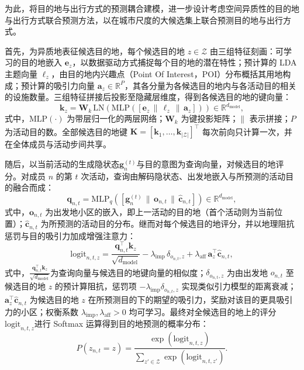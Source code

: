 为此，将目的地与出行方式的预测耦合建模，进一步设计考虑空间异质性的目的地与出行方式联合预测方法，以在城市尺度的大候选集上联合预测目的地与出行方式。

首先，为异质地表征候选目的地，每个候选目的地 $z\in\mathcal{Z}$ 由三组特征刻画：可学习的目的地嵌入 $\mathbf{e}_z$，以数据驱动方式捕捉每个目的地的潜在特性；预计算的 LDA 主题向量 $\boldsymbol{\ell}_z$，由目的地内兴趣点（Point Of Interest，POI）分布概括其用地构成；预计算的吸引力向量 $\mathbf{a}_z\in\mathbb{R}^{P}$，其各分量为各候选目的地内与各活动目的相关的设施数量。三组特征拼接后投影至隐藏层维度，得到各候选目的地的键向量：
\begin{equation}
\mathbf{k}_z=\mathbf{W}_k\,\mathrm{LN}\!\left(\mathrm{MLP}\!\left(\left[\mathbf{e}_z\,\|\,\boldsymbol{\ell}_z\,\|\,\mathbf{a}_z\right]\right)\right)\in\mathbb{R}^{d_{\text{model}}},
\label{eq.cohact.zonekey}
\end{equation}
式中，$\mathrm{MLP}(\cdot)$ 为带层归一化的两层网络；$\mathbf{W}_k$ 为键投影矩阵；$\|$ 表示拼接；$P$ 为活动目的数。全部候选目的地键 $\mathbf{K}=[\mathbf{k}_1,\dots,\mathbf{k}_{|\mathcal{Z}|}]^{\top}$ 每次前向只计算一次，并在全体成员与活动步间共享。

随后，以当前活动的生成隐状态$\mathbf{g}_n^{(t)}$与目的意图为查询向量，对候选目的地评分。对成员 $n$ 的第 $t$ 次活动，查询由解码隐状态、出发地嵌入与所预测的活动目的融合而成：
\begin{equation}
\mathbf{q}_{n,t}=\mathrm{MLP}_q\!\left(\left[\mathbf{g}_n^{(t)}\,\|\,\mathbf{o}_{n,t}\,\|\,\hat{\mathbf{c}}_{n,t}\right]\right)\in\mathbb{R}^{d_{\text{model}}},
\label{eq.cohact.destquery}
\end{equation}
式中，$\mathbf{o}_{n,t}$ 为出发地小区的嵌入，即上一活动的目的地（首个活动则为当前位置）；$\hat{\mathbf{c}}_{n,t}$ 为所预测的活动目的分布。继而对每个候选目的地评分，并以地理阻抗惩罚与目的吸引力加成增强注意力：
\begin{equation}
\mathrm{logit}_{n,t,z}=\frac{\mathbf{q}_{n,t}^{\top}\mathbf{k}_z}{\sqrt{d_{\text{model}}}}-\lambda_{\text{imp}}\,\delta_{o_{n,t},z}+\lambda_{\text{aff}}\,\mathbf{a}_z^{\top}\hat{\mathbf{c}}_{n,t},
\label{eq.cohact.destlogit}
\end{equation}
式中，$\frac{\mathbf{q}_{n,t}^{\top}\mathbf{k}_z}{\sqrt{d_{\text{model}}}}$为查询向量与候选目的地键向量的相似度；$\delta_{o_{n,t},z}$ 为由出发地 $o_{n,t}$ 至候选目的地 $z$ 的预计算阻抗，惩罚项 $-\lambda_{\text{imp}}\delta_{o_{n,t},z}$ 实现类似引力模型的距离衰减；$\mathbf{a}_z^{\top}\hat{\mathbf{c}}_{n,t}$ 为候选目的地 $z$ 在所预测目的下的期望的吸引力，奖励对该目的更具吸引力的小区；权衡系数 $\lambda_{\text{imp}},\lambda_{\text{aff}}>0$ 均可学习。最终对全候选目的地上的评分 $\mathrm{logit}_{n,t,z}$进行 Softmax 运算得到目的地预测的概率分布：
\begin{equation}
P\!\left(z_{n,t}=z\right)=\frac{\exp\!\left(\mathrm{logit}_{n,t,z}\right)}{\sum_{z'\in\mathcal{Z}}\exp\!\left(\mathrm{logit}_{n,t,z'}\right)}.
\label{eq.cohact.destsoftmax}
\end{equation}

